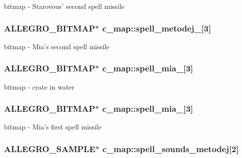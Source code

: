 bitmap -\/ Starovous' second spell missile \hypertarget{classc__map_a7299ee552482b6917b4aae7f24263392}{
\subsubsection[{spell\-\_\-metodej\-\_\-1}]{\setlength{\rightskip}{0pt plus 5cm}A\-L\-L\-E\-G\-R\-O\-\_\-\-B\-I\-T\-M\-A\-P$\ast$ c\-\_\-map\-::spell\-\_\-metodej\-\_\mbox{[}3\mbox{]}\hspace{0.3cm}{\ttfamily [protected]}}}\label{classc__map_a7299ee552482b6917b4aae7f24263392}
bitmap -\/ Mia's second spell missile \hypertarget{classc__map_a6191d8333fa50a672d1cb02957182b7e}{
\subsubsection[{spell\-\_\-mia\-\_\-1}]{\setlength{\rightskip}{0pt plus 5cm}A\-L\-L\-E\-G\-R\-O\-\_\-\-B\-I\-T\-M\-A\-P$\ast$ c\-\_\-map\-::spell\-\_\-mia\-\_\mbox{[}3\mbox{]}\hspace{0.3cm}{\ttfamily [protected]}}}\label{classc__map_a6191d8333fa50a672d1cb02957182b7e}
bitmap -\/ crate in water \hypertarget{classc__map_abea93f3e180070e80bb0dc7f061969cb}{
\subsubsection[{spell\-\_\-mia\-\_\-2}]{\setlength{\rightskip}{0pt plus 5cm}A\-L\-L\-E\-G\-R\-O\-\_\-\-B\-I\-T\-M\-A\-P$\ast$ c\-\_\-map\-::spell\-\_\-mia\-\_\mbox{[}3\mbox{]}\hspace{0.3cm}{\ttfamily [protected]}}}\label{classc__map_abea93f3e180070e80bb0dc7f061969cb}
bitmap -\/ Mia's first spell missile \hypertarget{classc__map_aec438098bd5ded52ab9c831cd19eb629}{
\subsubsection[{spell\-\_\-sounds\-\_\-metodej}]{\setlength{\rightskip}{0pt plus 5cm}A\-L\-L\-E\-G\-R\-O\-\_\-\-S\-A\-M\-P\-L\-E$\ast$ c\-\_\-map\-::spell\-\_\-sounds\-\_\-metodej\mbox{[}2\mbox{]}\hspace{0.3cm}{\ttfamily [protected]}}}\label{classc__map_aec438098bd5ded52ab9c831cd19eb629}
